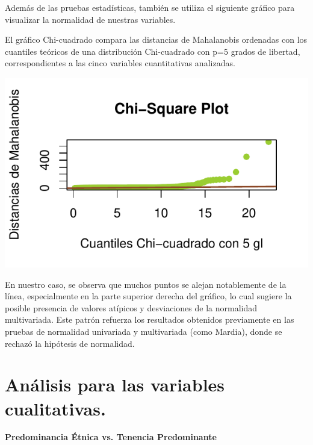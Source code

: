 \documentclass[]{tufte-handout}
\begin{document}
\begin{justify}
Además de las pruebas estadísticas, también se utiliza el siguiente gráfico para visualizar la normalidad de nuestras variables.

El gráfico Chi-cuadrado compara las distancias de Mahalanobis ordenadas con los cuantiles teóricos de una distribución Chi-cuadrado con p=5 grados de libertad, correspondientes a las cinco variables cuantitativas analizadas.
\begin{marginfigure}
\includegraphics[width=1.3\linewidth]{Informe_files/figure-latex/chi-square-1} \end{marginfigure}
En nuestro caso, se observa que muchos puntos se alejan notablemente de la línea, especialmente en la parte superior derecha del gráfico, lo cual sugiere la posible presencia de valores atípicos y desviaciones de la normalidad multivariada. Este patrón refuerza los resultados obtenidos previamente en las pruebas de normalidad univariada y multivariada (como Mardia), donde se rechazó la hipótesis de normalidad.
\end{justify}

\section{Análisis para las variables
cualitativas.}\label{anuxe1lisis-para-las-variables-cualitativas.}

\begin{center}
\textbf{Predominancia Étnica vs. Tenencia Predominante}
\end{center}
\end{document}
